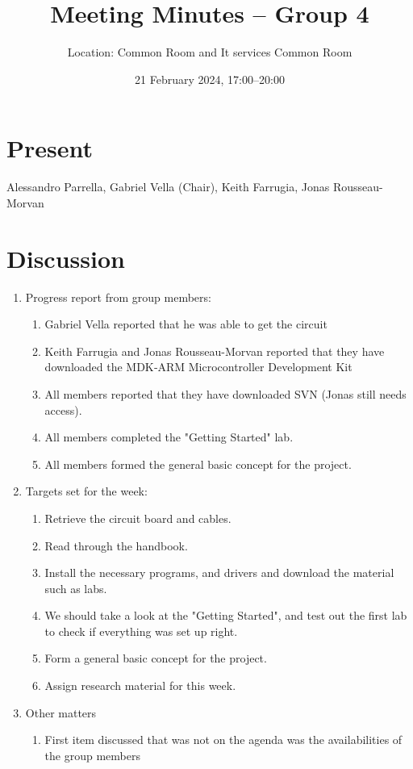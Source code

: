 \documentclass{cce2014-meetings}
\title{Meeting Minutes -- Group 4}
\author{Location: Common Room and It services Common Room}
\date{21 February 2024, 17:00--20:00}
\begin{document}
\maketitle

\section*{Present}
Alessandro Parrella,
Gabriel Vella (Chair),
Keith Farrugia,
Jonas Rousseau-Morvan


\section*{Discussion}

\begin{enumerate}

   \item Progress report from group members:
         \begin{enumerate}
            \item Gabriel Vella reported that he was able to get the circuit
            \item Keith Farrugia and Jonas Rousseau-Morvan reported that they have downloaded the MDK‐ARM Microcontroller Development Kit
            \item All members reported that they have downloaded SVN (Jonas still needs access).
            \item All members completed the "Getting Started" lab.
            \item All members formed the general basic concept for the project.
         \end{enumerate}

   \item Targets set for the week:
         \begin{enumerate}
            \item Retrieve the circuit board and cables.
            \item Read through the handbook.
            \item Install the necessary programs, and drivers and download the material such as labs.
            \item We should take a look at the "Getting Started", and test out the first lab to check if everything was set up right.
            \item Form a general basic concept for the project.
            \item Assign research material for this week.
         \end{enumerate}
         
   \item Other matters
         \begin{enumerate}
            \item First item discussed that was not on the agenda was the availabilities of the group members
         \end{enumerate}

\end{enumerate}
\end{document}
